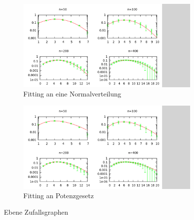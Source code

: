 \documentclass[10pt]{article}
\begin{document}
\begin{figure}[htb!]
\begin{subfigure}{.5\textwidth}
  \centering
  \includegraphics[width=\linewidth]{../Results/wErrorbars_Normal_Planar.png}
  \caption{Fitting an eine Normalverteilung}
\end{subfigure}%
\begin{subfigure}{.5\textwidth}
  \centering
  \includegraphics[width=\linewidth]{../Results/wErrorbars_Power_Planar.png}
  \caption{Fitting an Potenzgesetz}
\end{subfigure}
\caption{Ebene Zufallsgraphen}
\label{fig:planar}
\end{figure}
\end{document}
